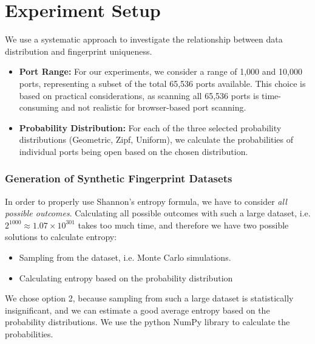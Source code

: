 \clearpage
\section{Experiment Setup}

We use a systematic approach to investigate the relationship between data distribution and fingerprint uniqueness. 

\begin{itemize}
\item \textbf{Port Range:} For our experiments, we consider a range of 1,000 and 10,000 ports, representing a subset of the total 65,536 ports available. This choice is based on practical considerations, as scanning all 65,536 ports is time-consuming and not realistic for browser-based port scanning.

\item \textbf{Probability Distribution:} For each of the three selected probability distributions (Geometric, Zipf, Uniform), we calculate the probabilities of individual ports being open based on the chosen distribution. 
\end{itemize}

\subsubsection{Generation of Synthetic Fingerprint Datasets}

In order to properly use Shannon's entropy formula, we have to consider \emph{all possible outcomes}. Calculating all possible outcomes with such a large dataset, i.e. $2^{1000} \approx 1.07 \times 10^{301}$ takes too much time, and therefore we have two possible solutions to calculate entropy:

\begin{itemize}
    \item Sampling from the dataset, i.e. Monte Carlo simulations.
    \item Calculating entropy based on the probability distribution
\end{itemize}

We chose option 2, because sampling from such a large dataset is statistically insignificant, and we can estimate a good average entropy based on the probability distributions.
We use the python NumPy library to calculate the probabilities.


